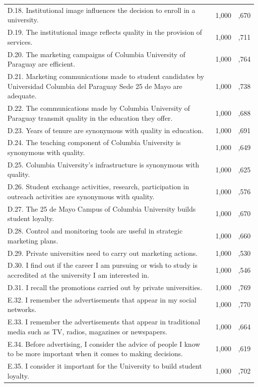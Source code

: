 \documentclass[english]{textolivre}
\begin{document}
\begin{table}[h!]
\begin{tabular}{p{}ll}
D.18. Institutional image influences the decision to enroll in a university. & 1,000 & ,670 \\
D.19. The institutional image reflects quality in the provision of services. & 1,000 & ,711 \\
D.20. The marketing campaigns of Columbia University of Paraguay are efficient. & 1,000 & ,764 \\
D.21. Marketing communications made to student candidates by Universidad Columbia del Paraguay Sede 25 de Mayo are adequate. &	1,000 & ,738\\
D.22. The communications made by Columbia University of Paraguay transmit quality in the education they offer. & 1,000 & ,688 \\
D.23. Years of tenure are synonymous with quality in education. & 1,000 & ,691 \\
D.24. The teaching component of Columbia University is synonymous with quality. & 1,000 & ,649 \\
D.25. Columbia University's infrastructure is synonymous with quality. & 1,000 & ,625 \\
D.26. Student exchange activities, research, participation in outreach activities are synonymous with quality. & 1,000 & ,576 \\
D.27. The 25 de Mayo Campus of Columbia University builds student loyalty. & 1,000 &	,670 \\
D.28. Control and monitoring tools are useful in strategic marketing plans. & 1,000 & ,660 \\
D.29. Private universities need to carry out marketing actions. & 1,000 & ,530 \\
D.30. I find out if the career I am pursuing or wish to study is accredited at the university I am interested in. & 1,000 & ,546 \\
D.31. I recall the promotions carried out by private universities. & 1,000 & ,769 \\
E.32. I remember the advertisements that appear in my social networks. & 1,000 & ,770 \\
E.33. I remember the advertisements that appear in traditional media such as TV, radios, magazines or newspapers. & 1,000 & ,664 \\
E.34. Before advertising, I consider the advice of people I know to be more important when it comes to making decisions. & 1,000 & ,619 \\
E.35. I consider it important for the University to build student loyalty. & 1,000 &	,702 \\

\end{tabular}
\end{table}
\end{document}
